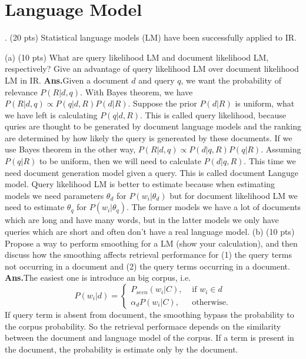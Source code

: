 \documentclass[11pt]{exam}
\newcommand{\ans}{\textbf{Ans.}}
\begin{document}
\section{Language Model}
\begin{questions}
  . (20 pts) Statistical language models (LM) have been successfully applied to IR.
  \begin{subparts}
    \subpart (a) (10 pts) What are query likelihood LM and document likelihood LM, respectively? Give an advantage of query likelihood LM over document likelihood LM in IR.
   \ans Given a document $d$ and query $q$, we want the probability of relevance 
   $P(R|d,q)$. With Bayes theorem, we have $P(R|d,q)\propto P(q|d,R)P(d|R)$. 
   Suppose the prior $P(d|R)$ is uniform, what we have left is calculating 
   $P(q|d,R)$. This is called query likelihood, because quries are thought to be 
   generated by document language models and the ranking are determined by how 
   likely the query is genereated by these documents. If we use Bayes theorem in 
   the other way, $P(R|d,q)\propto P(d|q,R)P(q|R)$. Assuming $P(q|R)$ to be 
   uniform, then we will need to calculate $P(d|q,R)$. This time we need 
   document generation model given a query. This is called document Languge 
   model. Query likelihood LM is better to estimate because when estimating models we need parameters $\theta_d$ 
   for $P(w_i|\theta_d)$ but for document likelihood LM we need to estimate $\theta_q$ 
   for $P(w_i|\theta_q)$. The former models we have a lot of documents which are 
   long and have many words, but in the latter models we only have queries which 
   are short and often don't have a real language model.
   \subpart (b) (10 pts) Propose a way to perform smoothing for a LM (show your calculation), and
then discuss how the smoothing affects retrieval performance for (1) the query terms not occurring in a document and (2) the query terms occurring in a document.
\ans The easiest one is introduce an big corpus, i.e. 
\begin{equation}
  P(w_i|d)=
\begin{cases}
  P_{seen}(w_i|C), &\mbox{ if $w_i \in d$ } \\
  \alpha_d P(w_i|C), &\mbox{ otherwise.}
\end{cases}
\end{equation}
If query term is absent from document, the smoothing bypass the probability to 
the corpus probability. So the retrieval performace depends on the similarity between the document and language model 
of the corpus. If a term is present in the document, the probability is estimate 
only by the document.
  \end{subparts}
\end{questions}
\end{document}
